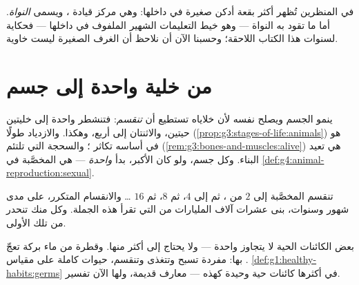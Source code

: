 \begin{remark}\label{rem:g5:first-look-at-cells:nucleus}
في المنظرين تُظهر أكثر  بقعة أدكن صغيرة في داخلها: وهي مركز
قيادة ، ويسمى \emph{النواة}. أما ما تقود به
النواة --- وهو خيط التعليمات الشهير الملفوف في داخلها --- فحكاية
لسنوات هذا الكتاب اللاحقة؛ وحسبنا الآن أن نلاحظ أن الغرف الصغيرة
ليست خاوية.
\end{remark}

\section{من خلية واحدة إلى جسم}

\begin{proposition}\label{prop:g5:first-look-at-cells:growth}
ينمو الجسم ويصلح نفسه لأن خلاياه تستطيع أن \emph{تنقسم}: فتنشطر
 واحدة إلى خليتين حيتين، والاثنتان إلى أربع، وهكذا. والازدياد
طولًا (\cref{prop:g3:stages-of-life:animals}) هو في أساسه تكاثر
؛ والسحجة التي تلتئم
(\cref{rem:g3:bones-and-muscles:alive}) هي  تعيد البناء. وكل
جسم، ولو كان الأكبر، بدأ \emph{ واحدة} --- هي 
المخصَّبة في \cref{def:g4:animal-reproduction:sexual}.
\end{proposition}
\admitted

\begin{example}\label{ex:g5:first-look-at-cells:one}
تنقسم  المخصَّبة إلى $2$ من ، ثم إلى $4$، ثم $8$، ثم
$16$ \dots{} والانقسام المتكرر، على مدى شهور وسنوات، بنى عشرات
آلاف المليارات من  التي تقرأ هذه الجملة. وكل  منك تنحدر
من تلك  الأولى.
\end{example}

\begin{remark}\label{rem:g5:first-look-at-cells:onecelled}
بعض الكائنات الحية لا يتجاوز  واحدة --- ولا يحتاج إلى أكثر
منها. وقطرة من ماء بركة تعجّ بها:  مفردة تسبح وتتغذى وتنقسم،
حيوات كاملة على مقياس . 
\cref{def:g1:healthy-habits:germs} في أكثرها كائنات حية وحيدة
 كهذه --- معارف قديمة، ولها الآن تفسير.
\end{remark}

